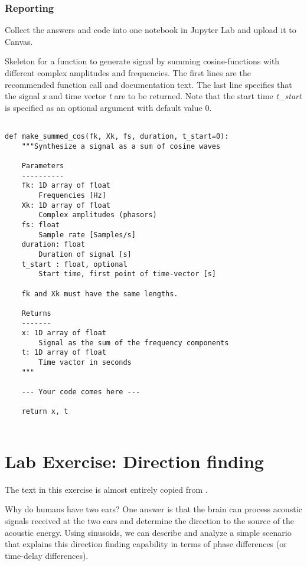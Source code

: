 \subsubsection*{Reporting}
Collect the answers and code into one notebook in Jupyter Lab and upload it to Canvas.

\begin{table}[t!]
	\caption{Skeleton for a function to generate signal by summing cosine-functions with different complex amplitudes and frequencies.		
	The first lines are the recommended function call and documentation text. The last line specifies that the signal \emph{x} and time vector \emph{t} are to be returned. 	
	Note that the start time \emph{t\_start} is specified as an optional argument with default value \num{0}.
	}
	\label{tab:summed_cos}
	
\begin{lstlisting}[style=pythonstyle]

def make_summed_cos(fk, Xk, fs, duration, t_start=0):
	"""Synthesize a signal as a sum of cosine waves

	Parameters
	----------
	fk: 1D array of float
		Frequencies [Hz]
	Xk: 1D array of float
		Complex amplitudes (phasors)
	fs: float
		Sample rate [Samples/s]
	duration: float
		Duration of signal [s]
	t_start : float, optional
		Start time, first point of time-vector [s]
	
	fk and Xk must have the same lengths.

	Returns
	-------
	x: 1D array of float
		Signal as the sum of the frequency components
	t: 1D array of float
		Time vactor in seconds
	"""

	--- Your code comes here ---

	return x, t
	
\end{lstlisting}
\end{table}
	

\section{Lab Exercise: Direction finding}
The text in this exercise is almost entirely copied from \cite{mcclellan_lab_2016}.

Why do humans have two ears? One answer is that the brain can process acoustic signals received at the two ears and determine the direction to the source of the acoustic energy. Using sinusoids, we can describe and analyze a simple scenario that explains this direction finding capability in terms of phase differences (or time-delay differences). 

